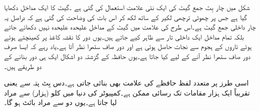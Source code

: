 شکل    میں چار بِٹ جمع گیٹ کی ایک نئی علامت استعمال کی گئی ہے ۔گیٹ کا ایک مداخل دکھایا گیا ہے جس پر چھوٹی ترچھی لکیر کے ساتھ  لکھ کر اس بات کی وضاحت کی گئی ہے کہ دراصل یہ چار داخلی جمع گیٹ ہے۔اس طرح کی علامت میں گیٹ کے مداخل علیحدہ علیحدہ نہیں دکھائے جاتے بلکہ تمام مداخل ایک داخلی تار سے ظاہر کیے جاتے ہیں۔یوں دور کا نقشہ کاغذ پر کھینچتے ہوئے ہوئے تاروں کے ہجوم سے نجات حاصل ہوتی ہے اور دور صاف ستھرا نظر آتا ہے۔یاد رہے کہ ایسا صرف دور صاف ستھرا نظر آنے کے لیے کیا جاتا ہے۔یوں حافظہ کے گزشتہ دو اشکال ایک ہی دور بنانے کے دو طریقے ہیں۔

اسی طرز پر متعدد لفظ حافظے کی علامت بھی بنائی جاتی ہے۔دس بِٹ پتہ سے  یعنی تقریباً ایک ہزار مقامات تک رسائی ممکن ہے۔کمپیوٹر کی دنیا میں کلو (ہزار) سے مراد لیا جاتا ہے۔یوں دو  سے مراد  بائٹ  ہو گا۔

